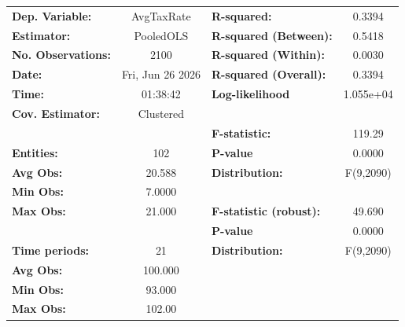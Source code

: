 \begin{center}
\begin{tabular}{lclc}
\toprule
\textbf{Dep. Variable:}                       &     AvgTaxRate     & \textbf{  R-squared:         }   &      0.3394      \\
\textbf{Estimator:}                           &     PooledOLS      & \textbf{  R-squared (Between):}  &      0.5418      \\
\textbf{No. Observations:}                    &        2100        & \textbf{  R-squared (Within):}   &      0.0030      \\
\textbf{Date:}                                &  Fri, Jun 26 2026  & \textbf{  R-squared (Overall):}  &      0.3394      \\
\textbf{Time:}                                &      01:38:42      & \textbf{  Log-likelihood     }   &    1.055e+04     \\
\textbf{Cov. Estimator:}                      &     Clustered      & \textbf{                     }   &                  \\
\textbf{}                                     &                    & \textbf{  F-statistic:       }   &      119.29      \\
\textbf{Entities:}                            &        102         & \textbf{  P-value            }   &      0.0000      \\
\textbf{Avg Obs:}                             &       20.588       & \textbf{  Distribution:      }   &    F(9,2090)     \\
\textbf{Min Obs:}                             &       7.0000       & \textbf{                     }   &                  \\
\textbf{Max Obs:}                             &       21.000       & \textbf{  F-statistic (robust):} &      49.690      \\
\textbf{}                                     &                    & \textbf{  P-value            }   &      0.0000      \\
\textbf{Time periods:}                        &         21         & \textbf{  Distribution:      }   &    F(9,2090)     \\
\textbf{Avg Obs:}                             &      100.000       & \textbf{                     }   &                  \\
\textbf{Min Obs:}                             &       93.000       & \textbf{                     }   &                  \\
\textbf{Max Obs:}                             &       102.00       & \textbf{                     }   &                  \\

\end{tabular}
\end{center}
